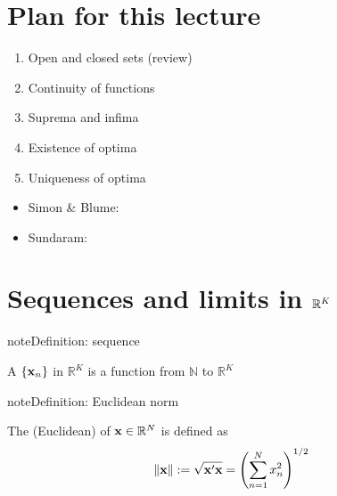\documentclass[letterpaper,10pt,english]{jupyterBook}
\begin{document}
\section{Plan for this lecture}
\label{\detokenize{06.optimization_fundamentals:plan-for-this-lecture}}\begin{enumerate}
%
\item {} 
\sphinxAtStartPar
Open and closed sets (review)

\item {} 
\sphinxAtStartPar
Continuity of functions

\item {} 
\sphinxAtStartPar
Suprema and infima

\item {} 
\sphinxAtStartPar
Existence of optima

\item {} 
\sphinxAtStartPar
Uniqueness of optima

\end{enumerate}

\sphinxAtStartPar
{}
\begin{itemize}
\item {} 
\sphinxAtStartPar
Simon \& Blume:

\item {} 
\sphinxAtStartPar
Sundaram:

\end{itemize}


\section{Sequences and limits in \protect\(\mathbb{R}^K\protect\)}
\label{\detokenize{06.optimization_fundamentals:sequences-and-limits-in-mathbb-r-k}}
\begin{sphinxadmonition}{note}{Definition: sequence}

\sphinxAtStartPar
A  \(\{{\bf x}_n\}\) in \(\mathbb{R}^K\) is a function from \(\mathbb{N}\) to \(\mathbb{R}^K\)
\end{sphinxadmonition}

\begin{sphinxadmonition}{note}{Definition: Euclidean norm}

\sphinxAtStartPar
The (Euclidean)  of \({\bf x} \in \mathbb{R}^N\) is defined as
\begin{equation*}
\begin{split}
%
\| {\bf x} \| 
:= \sqrt{{\bf x}' {\bf x} } 
= \left( \sum_{n=1}^N x_n^2 \right)^{1/2}
%
\end{split}
\end{equation*}\end{sphinxadmonition}
\end{document}
